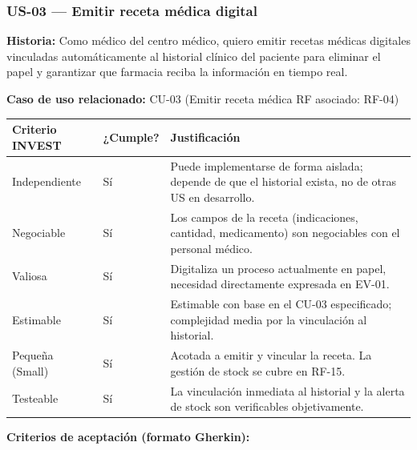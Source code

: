 \documentclass[11pt,a4paper]{article}
\begin{document}
	\subsubsection{US-03 --- Emitir receta médica digital}
	
	\textbf{Historia:} Como médico del centro médico, quiero emitir recetas médicas digitales vinculadas automáticamente al historial clínico del paciente para eliminar el papel y garantizar que farmacia reciba la información en tiempo real.
	
	\textbf{Caso de uso relacionado:} CU-03 (Emitir receta médica \textbar{} RF asociado: RF-04)
	
	\begin{longtable}{p{} p{} p{}}
		
		
		\toprule
		\textbf{Criterio INVEST} &
		\textbf{¿Cumple?} &
		\textbf{Justificación} \\
		\midrule
		\endhead
		
		Independiente & Sí & Puede implementarse de forma aislada; depende de que el historial exista, no de otras US en desarrollo. \\
		Negociable & Sí & Los campos de la receta (indicaciones, cantidad, medicamento) son negociables con el personal médico. \\
		Valiosa & Sí & Digitaliza un proceso actualmente en papel, necesidad directamente expresada en EV-01. \\
		Estimable & Sí & Estimable con base en el CU-03 especificado; complejidad media por la vinculación al historial. \\
		Pequeña (Small) & Sí & Acotada a emitir y vincular la receta. La gestión de stock se cubre en RF-15. \\
		Testeable & Sí & La vinculación inmediata al historial y la alerta de stock son verificables objetivamente. \\
		
		\bottomrule
	\end{longtable}
	
	\textbf{Criterios de aceptación (formato Gherkin):}
	
\end{document}
